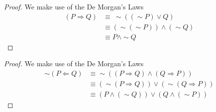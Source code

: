 \begin{proof} We make use of the De Morgan's Laws
    \begin{align*}
        (P \Rightarrow Q) &\equiv\:\sim((\sim P) \vee Q)\\[1.25ex]
        & \equiv (\sim (\sim P)) \wedge (\sim Q) \\[1.25ex]
        & \equiv P \wedge \sim Q
    \end{align*}
\end{proof}
\begin{proof} We make use of the De Morgan's Laws
    \begin{align*}
        \sim (P \Leftarrow Q) &\equiv \sim ((P \Rightarrow Q) \wedge
        (Q \Rightarrow P)) \\[1.25ex]
        &\equiv (\sim (P \Rightarrow Q)) \vee (\sim (Q \Rightarrow P)) \\[1.25ex] 
        &\equiv (P \wedge (\sim Q)) \vee (Q \wedge (\sim P))
    \end{align*}
\end{proof}

